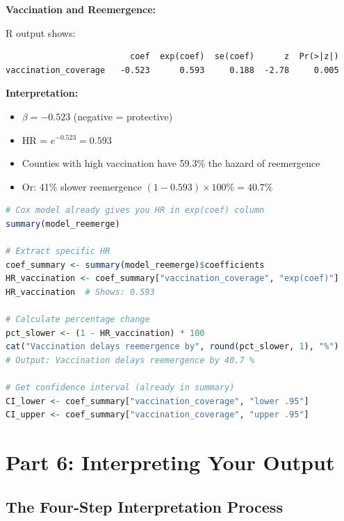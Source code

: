 \documentclass[11pt,a4paper]{article}
\begin{document}
\begin{example}
\textbf{Vaccination and Reemergence:}

R output shows:
\begin{verbatim}
                         coef  exp(coef)  se(coef)      z  Pr(>|z|)
vaccination_coverage   -0.523      0.593     0.188  -2.78     0.005
\end{verbatim}

\textbf{Interpretation:}
\begin{itemize}
    \item $\beta = -0.523$ (negative = protective)
    \item HR = $e^{-0.523} = 0.593$
    \item Counties with high vaccination have 59.3\% the hazard of reemergence
    \item Or: 41\% slower reemergence $(1 - 0.593) \times 100\% = 40.7\%$
\end{itemize}
\end{example}

\begin{rcode}
\begin{lstlisting}[language=R]
# Cox model already gives you HR in exp(coef) column
summary(model_reemerge)

# Extract specific HR
coef_summary <- summary(model_reemerge)$coefficients
HR_vaccination <- coef_summary["vaccination_coverage", "exp(coef)"]
HR_vaccination  # Shows: 0.593

# Calculate percentage change
pct_slower <- (1 - HR_vaccination) * 100
cat("Vaccination delays reemergence by", round(pct_slower, 1), "%")
# Output: Vaccination delays reemergence by 40.7 %

# Get confidence interval (already in summary)
CI_lower <- coef_summary["vaccination_coverage", "lower .95"]
CI_upper <- coef_summary["vaccination_coverage", "upper .95"]
\end{lstlisting}
\end{rcode}

\section{Part 6: Interpreting Your Output}

\subsection{The Four-Step Interpretation Process}
\end{document}
